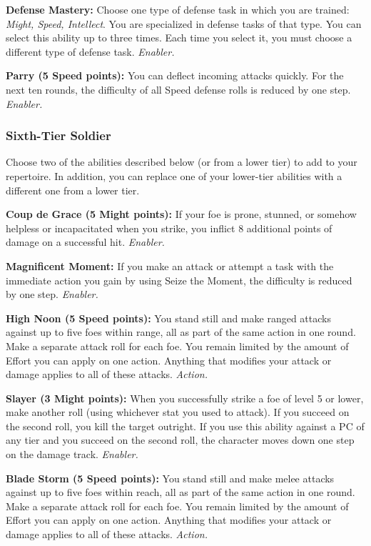 \documentclass[a4paper,10pt,final,twocolumn,oneside]{book}
\newcommand{\itemAbility}[2]{\textcolor{25gray}{\textbullet\textbf{ #1:}}{ #2}\par}
\newcommand{\enabler}{\textit{ Enabler.}}
\newcommand{\action}{\textit{ Action.}}
\begin{document}
\itemAbility{Defense Mastery}{Choose one type of defense task in which you are trained: \textit{Might, Speed, Intellect}. You are specialized in defense tasks of that type. You can select this ability up to three times. Each time you select it, you must choose a different type of defense task.\enabler}

\itemAbility{Parry (5 Speed points)}{You can deflect incoming attacks quickly. For the next ten rounds, the difficulty of all Speed defense rolls is reduced by one step.\enabler}


\subsubsection*{Sixth-Tier Soldier}
\label{subsub:soldierSixthTier}

Choose two of the abilities described below (or from a lower tier) to add to your repertoire. In addition, you can replace one of your lower-tier abilities with a different one from a lower tier.

\itemAbility{Coup de Grace (5 Might points)}{If your foe is prone, stunned, or somehow helpless or incapacitated when you strike, you inflict 8 additional points of damage on a successful hit.\enabler}

\itemAbility{Magnificent Moment}{If you make an attack or attempt a task with the immediate action you gain by using Seize the Moment, the difficulty is reduced by one step.\enabler}

\itemAbility{High Noon (5 Speed points)}{You stand still and make ranged attacks against up to five foes within range, all as part of the same action in one round. Make a separate attack roll for each foe. You remain limited by the amount of Effort you can apply on one action. Anything that modifies your attack or damage applies to all of these attacks.\action}

\itemAbility{Slayer (3 Might points)}{When you successfully strike a foe of level 5 or lower, make another roll (using whichever stat you used to attack). If you succeed on the second roll, you kill the target outright. If you use this ability against a PC of any tier and you succeed on the second roll, the character moves down one step on the damage track.\enabler}

\itemAbility{Blade Storm (5 Speed points)}{You stand still and make melee attacks against up to five foes within reach, all as part of the same action in one round. Make a separate attack roll for each foe. You remain limited by the amount of Effort you can apply on one action. Anything that modifies your attack or damage applies to all of these attacks.\action}
\end{document}
